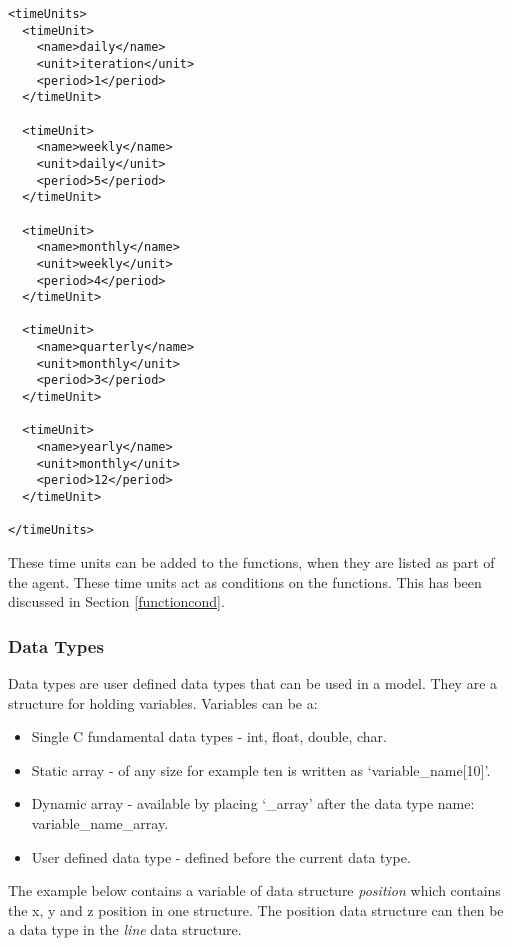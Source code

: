 \begin{mylisting}
\begin{verbatim}
<timeUnits>
  <timeUnit>
    <name>daily</name>
    <unit>iteration</unit>
    <period>1</period>
  </timeUnit>

  <timeUnit>
    <name>weekly</name>
    <unit>daily</unit>
    <period>5</period>
  </timeUnit>

  <timeUnit>
    <name>monthly</name>
    <unit>weekly</unit>
    <period>4</period>
  </timeUnit>

  <timeUnit>
    <name>quarterly</name>
    <unit>monthly</unit>
    <period>3</period>
  </timeUnit>

  <timeUnit>
    <name>yearly</name>
    <unit>monthly</unit>
    <period>12</period>
  </timeUnit>

</timeUnits>
\end{verbatim}
\end{mylisting}

These time units can be added to the functions, when they are listed as part of the agent. These time units act as conditions on the functions. This has been discussed in Section \ref{functioncond}.

\subsubsection{Data Types}

Data types are user defined data types that can be used in a model. They are a
structure for holding variables. Variables can be a:

\begin{itemize}
  \item Single C fundamental data types - int, float, double, char.
  \item Static array - of any size for example ten is written as `variable\_name[10]'.
  \item Dynamic array - available by placing `\_array' after
  the data type name: variable\_name\_array.
  \item User defined data type - defined before the current data type.
\end{itemize}

The example below contains a variable
of data structure \emph{position} which contains the x, y and z position in one structure. The position data structure can then be a data type in the \emph{line} data structure.

